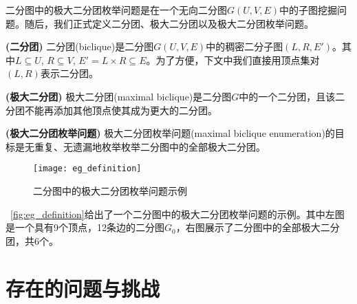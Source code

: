   二分图中的极大二分团枚举问题是在一个无向二分图$G(U,V,E)$中的子图挖掘问题。随后，我们正式定义二分团、极大二分团以及极大二分团枚举问题。

\begin{definition}
  \textup{\textbf{(二分团)}} 二分团(biclique)是二分图$G(U,V,E)$中的稠密二分子图$(L,R,E')$。其中$L\subseteq U$, $R\subseteq V$, $E' = L \times R \subseteq E$。为了方便，下文中我们直接用顶点集对$(L,R)$表示二分团。
\end{definition}

\begin{definition}
  \textup{\textbf{(极大二分团)}} 极大二分团(maximal biclique)是二分图$G$中的一个二分团，且该二分团不能再添加其他顶点使其成为更大的二分团。
\end{definition}

\begin{definition}
  \textup{\textbf{(极大二分团枚举问题)}} 极大二分团枚举问题(maximal biclique enumeration)的目标是无重复、无遗漏地枚举枚举二分图中的全部极大二分团。
\end{definition}

\begin{figure} [ht]
  \vspace{0.1 in}
  \centering
  \texttt{[image: eg\_definition]}
  \vspace{0.1 in}
  \caption{二分图中的极大二分团枚举问题示例}
  \label{fig:eg_definition}
\end{figure}

\begin{example}
  ~\autoref{fig:eg_definition}给出了一个二分图中的极大二分团枚举问题的示例。其中左图是一个具有9个顶点，12条边的二分图$G_0$，右图展示了二分图中的全部极大二分团，共6个。
  
\end{example}


\section{存在的问题与挑战}

